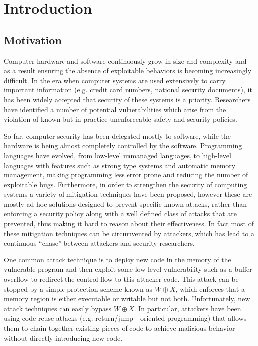 \chapter{Introduction}\label{ch:introduction}

\section{Motivation}\label{sec:motivation}

Computer hardware and software continuously grow in size and complexity and as a
result ensuring the absence of exploitable behaviors is becoming increasingly 
difficult. In the era when computer systems are used extensively to
carry important information (e.g. credit card numbers, national security
documents), it has been widely accepted that security of these systems is a
priority. Researchers have identified a number of potential vulnerabilities
which arise from the violation of known but in-practice unenforceable safety
and security policies.
 
So far, computer security has been delegated mostly to software, while the 
hardware is being almost completely controlled by the software. Programming
languages have evolved, from low-level unmanaged languages, to high-level
languages with features such as strong type systems and automatic memory
management, making programming less error prone and reducing the number of
exploitable bugs. Furthermore, in order to strengthen the security of computing
systems a variety of mitigation techniques  have been
proposed, however these are mostly ad-hoc solutions designed to prevent specific
known attacks, rather than enforcing a security policy along with a well defined
class of attacks that are prevented, thus making it hard to reason about their
effectiveness. In fact most of these mitigation techniques can be circumvented
by attackers,  which has lead to a continuous ``chase''
between attackers and security researchers.

One common attack technique is to deploy new code in the memory of the
vulnerable program and then exploit some low-level vulnerability such as a
buffer overflow to redirect the control flow to this attacker code. This attack
can be stopped by a simple protection scheme known as $W \oplus X$, which
enforces that a memory region is either executable or writable but not both.
Unfortunately, new attack techniques can easily bypass $W \oplus X$. In
particular, attackers have been using code-reuse attacks
(e.g. return/jump - oriented programming) that allows them to chain together
existing pieces of code to achieve malicious behavior without directly
introducing new code.

